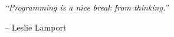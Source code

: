 
\vspace*{\fill}

{\Large\textit{``Programming is a nice break from thinking.''}}

\begin{flushright}
-- Leslie Lamport
\end{flushright}

\vspace*{\fill}
